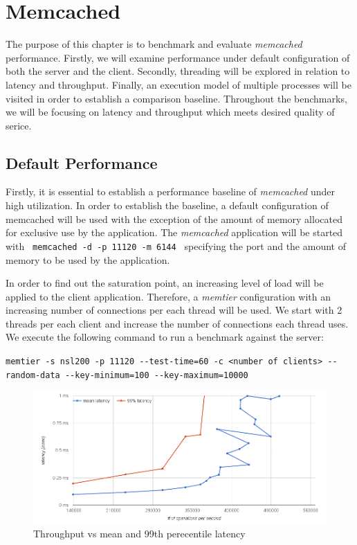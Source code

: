 \section{Memcached}

The purpose of this chapter is to benchmark and evaluate \emph{memcached} performance. Firstly, we will examine performance under default configuration of both the server and the client. Secondly, threading will be explored in relation to latency and throughput. Finally, an execution model of multiple processes will be visited in order to establish a comparison baseline. Throughout the benchmarks, we will be focusing on latency and throughput which meets desired quality of serice.

\subsection{Default Performance}

Firstly, it is essential to establish a performance baseline of \emph{memcached} under high utilization. In order to establish the baseline, a default configuration of memcached will be used with the exception of the amount of memory allocated for exclusive use by the application. The \emph{memcached} application will be started with \lstinline! memcached -d -p 11120 -m 6144 ! specifying the port and the amount of memory to be used by the application.

In order to find out the saturation point, an increasing level of load will be applied to the client application. Therefore, a \emph{memtier} configuration with an increasing number of connections per each thread will be used. We start with 2 threads per each client and increase the number of connections each thread uses. We execute the following command to run a benchmark against the server:

\texttt{memtier\ -s\ nsl200\ -p\ 11120\ -\/-test-time=60\ -c\ \textless{}number\ of\ clients\textgreater{}\ -\/-random-data\ -\/-key-minimum=100\ -\/-key-maximum=10000}

\begin{figure}[h]
    \includegraphics[width=\textwidth]{./res/5_baseline_latency_vs_ops.png}
    \caption{Throughput vs mean and 99th perecentile latency}
    \label{fig:memcached-default-latency-vs-ops}
\end{figure}

